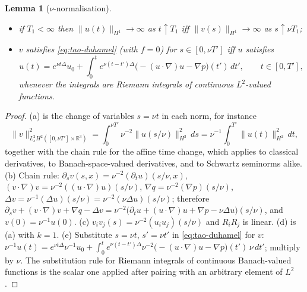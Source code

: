 \documentclass[11pt]{article}
\newtheorem{lemma}[theorem]{Lemma}
\theoremstyle{definition}
\theoremstyle{plain}
\newcommand{\R}{\mathbb R}
\newcommand{\norm}[1]{\lVert #1\rVert}
\begin{document}
\begin{lemma}[$\nu$-normalisation]
\begin{itemize}
\item[(d)] if $T_1<\infty$ then $\norm{u(t)}_{H^1}\to\infty$ as
$t\uparrow T_1$ iff $\norm{v(s)}_{H^1}\to\infty$ as $s\uparrow\nu T_1$;
\item[(e)] $v$ satisfies \eqref{eq:tao-duhamel} (with $f=0$) for
$s\in[0,\nu T']$ iff $u$ satisfies
\begin{equation}\label{eq:nu-duhamel}
 u(t)=e^{\nu t\Delta}u_0+\int_0^te^{\nu(t-t')\Delta}
 \bigl(-(u\cdot\nabla)u-\nabla p\bigr)(t')\,dt',\qquad t\in[0,T'],
\end{equation}
whenever the integrals are Riemann integrals of continuous $L^2$-valued
functions.
\end{itemize}
\end{lemma}

\begin{proof}
(a) is the change of variables $s=\nu t$ in each norm, for instance
\[
 \norm v_{L^2_sH^2([0,\nu T']\times\R^3)}^2
 =\int_0^{\nu T'}\nu^{-2}\norm{u(s/\nu)}_{H^2}^2\,ds
 =\nu^{-1}\int_0^{T'}\norm{u(t)}_{H^2}^2\,dt ,
\]
together with the chain rule for the affine time change, which applies to classical derivatives, to
Banach-space-valued derivatives, and to Schwartz seminorms alike.  (b)
Chain rule: $\partial_sv(s,x)=\nu^{-2}(\partial_tu)(s/\nu,x)$,
$(v\cdot\nabla)v=\nu^{-2}((u\cdot\nabla)u)(s/\nu)$,
$\nabla q=\nu^{-2}(\nabla p)(s/\nu)$, $\Delta v=\nu^{-1}(\Delta u)(s/\nu)
=\nu^{-2}(\nu\Delta u)(s/\nu)$; therefore $\partial_sv+(v\cdot\nabla)v
+\nabla q-\Delta v=\nu^{-2}\bigl(\partial_tu+(u\cdot\nabla)u+\nabla p
-\nu\Delta u\bigr)(s/\nu)$, and $v(0)=\nu^{-1}u(0)$.  (c)
$v_iv_j(s)=\nu^{-2}(u_iu_j)(s/\nu)$ and $R_iR_j$ is linear.  (d) is (a)
with $k=1$.  (e) Substitute $s=\nu t$, $s'=\nu t'$ in
\eqref{eq:tao-duhamel} for $v$: $\nu^{-1}u(t)=e^{\nu t\Delta}\nu^{-1}u_0
+\int_0^te^{\nu(t-t')\Delta}\nu^{-2}\bigl(-(u\cdot\nabla)u-\nabla p
\bigr)(t')\,\nu\,dt'$; multiply by $\nu$.  The substitution rule for
Riemann integrals of continuous Banach-valued functions is the scalar one
applied after pairing with an arbitrary element of $L^2$.
\end{proof}
\end{document}
